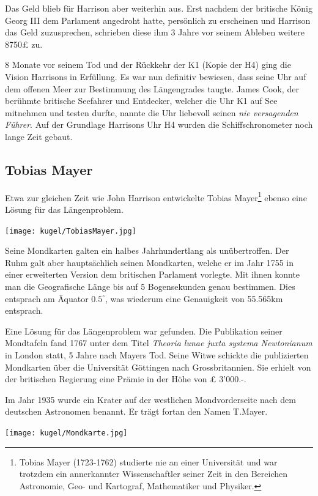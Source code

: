 \begin{refsection}
Das Geld blieb für Harrison aber weiterhin aus. Erst nachdem der britische König Georg III dem Parlament angedroht hatte, persönlich zu erscheinen und Harrison das Geld zuzusprechen, schrieben diese ihm 3 Jahre vor seinem Ableben weitere 8750£ zu.

8 Monate vor seinem Tod und der Rückkehr der K1 (Kopie der H4) ging die Vision Harrisons in Erfüllung. Es war nun definitiv bewiesen, dass seine Uhr auf dem offenen Meer zur Bestimmung des Längengrades taugte. James Cook, der berühmte britische Seefahrer und Entdecker, welcher die Uhr K1 auf See mitnehmen und testen durfte, nannte die Uhr liebevoll seinen \textit{nie versagenden Führer}.
Auf der Grundlage Harrisons Uhr H4 wurden die Schiffschronometer noch lange Zeit gebaut.



\subsection{Tobias Mayer}
Etwa zur gleichen Zeit wie John Harrison entwickelte Tobias Mayer\footnote{%
Tobias Mayer (1723-1762) studierte nie an einer Universität und war trotzdem ein annerkannter Wissenschaftler seiner Zeit in den Bereichen Astronomie, Geo- und Kartograf, Mathematiker und Physiker.}
ebenso eine Lösung für das Längenproblem.
\begin{center}
        \texttt{[image: kugel/TobiasMayer.jpg]}
\end{center}
Seine Mondkarten galten ein halbes Jahrhundertlang als unübertroffen. Der Ruhm galt aber hauptsächlich seinen Mondkarten, welche er im Jahr 1755 in einer erweiterten Version dem britischen Parlament vorlegte.
Mit ihnen konnte man die Geografische Länge bis auf 5 Bogensekunden genau bestimmen. Dies entsprach am Äquator $0.5 ^{\circ}$, was wiederum eine Genauigkeit von 55.565km entsprach.

Eine Lösung für das Längenproblem war gefunden. Die Publikation seiner Mondtafeln fand 1767 unter dem Titel \textit{Theoria lunae juxta systema Newtonianum} in London statt, 5 Jahre nach Mayers Tod. 
Seine Witwe schickte die publizierten Mondkarten über die Universität Göttingen nach Grossbritannien. Sie erhielt von der britischen Regierung eine Prämie in der Höhe von £ 3’000.-.

Im Jahr 1935 wurde ein Krater auf der westlichen Mondvorderseite nach dem deutschen Astronomen benannt. Er trägt fortan den Namen T.Mayer.
\begin{center}
        \texttt{[image: kugel/Mondkarte.jpg]}
\end{center}



\end{refsection}
